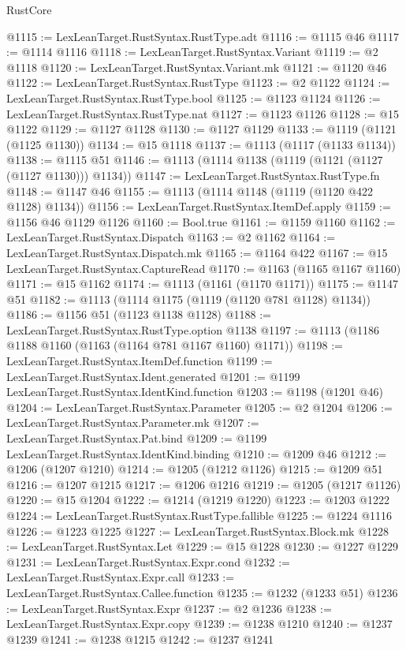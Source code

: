 \begin{lexlean}{RustCore}
\begin{coremodule}
@1115 := LexLeanTarget.RustSyntax.RustType.adt
@1116 := @1115 @46
@1117 := @1114 @1116
@1118 := LexLeanTarget.RustSyntax.Variant
@1119 := @2 @1118
@1120 := LexLeanTarget.RustSyntax.Variant.mk
@1121 := @1120 @46
@1122 := LexLeanTarget.RustSyntax.RustType
@1123 := @2 @1122
@1124 := LexLeanTarget.RustSyntax.RustType.bool
@1125 := @1123 @1124
@1126 := LexLeanTarget.RustSyntax.RustType.nat
@1127 := @1123 @1126
@1128 := @15 @1122
@1129 := @1127 @1128
@1130 := @1127 @1129
@1133 := @1119 (@1121 (@1125 @1130))
@1134 := @15 @1118
@1137 := @1113 (@1117 (@1133 @1134))
@1138 := @1115 @51
@1146 := @1113 (@1114 @1138 (@1119 (@1121 (@1127 (@1127 @1130))) @1134))
@1147 := LexLeanTarget.RustSyntax.RustType.fn
@1148 := @1147 @46
@1155 := @1113 (@1114 @1148 (@1119 (@1120 @422 @1128) @1134))
@1156 := LexLeanTarget.RustSyntax.ItemDef.apply
@1159 := @1156 @46 @1129 @1126
@1160 := Bool.true
@1161 := @1159 @1160
@1162 := LexLeanTarget.RustSyntax.Dispatch
@1163 := @2 @1162
@1164 := LexLeanTarget.RustSyntax.Dispatch.mk
@1165 := @1164 @422
@1167 := @15 LexLeanTarget.RustSyntax.CaptureRead
@1170 := @1163 (@1165 @1167 @1160)
@1171 := @15 @1162
@1174 := @1113 (@1161 (@1170 @1171))
@1175 := @1147 @51
@1182 := @1113 (@1114 @1175 (@1119 (@1120 @781 @1128) @1134))
@1186 := @1156 @51 (@1123 @1138 @1128)
@1188 := LexLeanTarget.RustSyntax.RustType.option @1138
@1197 := @1113 (@1186 @1188 @1160 (@1163 (@1164 @781 @1167 @1160) @1171))
@1198 := LexLeanTarget.RustSyntax.ItemDef.function
@1199 := LexLeanTarget.RustSyntax.Ident.generated
@1201 := @1199 LexLeanTarget.RustSyntax.IdentKind.function
@1203 := @1198 (@1201 @46)
@1204 := LexLeanTarget.RustSyntax.Parameter
@1205 := @2 @1204
@1206 := LexLeanTarget.RustSyntax.Parameter.mk
@1207 := LexLeanTarget.RustSyntax.Pat.bind
@1209 := @1199 LexLeanTarget.RustSyntax.IdentKind.binding
@1210 := @1209 @46
@1212 := @1206 (@1207 @1210)
@1214 := @1205 (@1212 @1126)
@1215 := @1209 @51
@1216 := @1207 @1215
@1217 := @1206 @1216
@1219 := @1205 (@1217 @1126)
@1220 := @15 @1204
@1222 := @1214 (@1219 @1220)
@1223 := @1203 @1222
@1224 := LexLeanTarget.RustSyntax.RustType.fallible
@1225 := @1224 @1116
@1226 := @1223 @1225
@1227 := LexLeanTarget.RustSyntax.Block.mk
@1228 := LexLeanTarget.RustSyntax.Let
@1229 := @15 @1228
@1230 := @1227 @1229
@1231 := LexLeanTarget.RustSyntax.Expr.cond
@1232 := LexLeanTarget.RustSyntax.Expr.call
@1233 := LexLeanTarget.RustSyntax.Callee.function
@1235 := @1232 (@1233 @51)
@1236 := LexLeanTarget.RustSyntax.Expr
@1237 := @2 @1236
@1238 := LexLeanTarget.RustSyntax.Expr.copy
@1239 := @1238 @1210
@1240 := @1237 @1239
@1241 := @1238 @1215
@1242 := @1237 @1241

\end{coremodule}
\end{lexlean}
